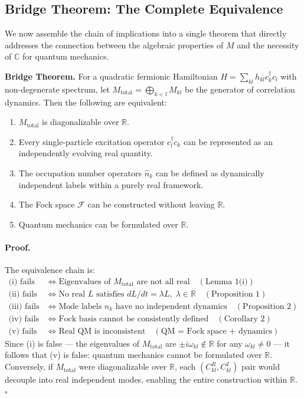 \documentclass[aps,pra,preprint,groupedaddress,amsmath,amssymb,floatfix]{revtex4-2}
\begin{document}
\subsection{Bridge Theorem: The Complete Equivalence}
\label{sec:th1_bridge}

We now assemble the chain of implications into a single theorem that directly addresses the connection between the algebraic properties of $M$ and the necessity of $\mathbb{C}$ for quantum mechanics.

\textbf{Bridge Theorem.} For a quadratic fermionic Hamiltonian $H = \sum_{kl} h_{kl} c^\dagger_k c_l$ with non-degenerate spectrum, let $M_{\text{total}} = \bigoplus_{k<l} M_{kl}$ be the generator of correlation dynamics. Then the following are equivalent:

\begin{enumerate}
\item[\textbf{(i)}] $M_{\text{total}}$ is diagonalizable over $\mathbb{R}$.
\item[\textbf{(ii)}] Every single-particle excitation operator $c^\dagger_l c_k$ can be represented as an independently evolving real quantity.
\item[\textbf{(iii)}] The occupation number operators $\hat{n}_k$ can be defined as dynamically independent labels within a purely real framework.
\item[\textbf{(iv)}] The Fock space $\mathcal{F}$ can be constructed without leaving $\mathbb{R}$.
\item[\textbf{(v)}] Quantum mechanics can be formulated over $\mathbb{R}$.
\end{enumerate}

\paragraph{Proof.} The equivalence chain is:
\begin{align*}
\text{(i) fails} &\Longleftrightarrow \text{Eigenvalues of } M_{\text{total}} \text{ are not all real} \quad (\text{Lemma~1(i)})\\
\text{(ii) fails} &\Longleftrightarrow \text{No real } L \text{ satisfies } dL/dt = \lambda L,\; \lambda\in\mathbb{R} \quad (\text{Proposition~1})\\
\text{(iii) fails} &\Longleftrightarrow \text{Mode labels } n_k \text{ have no independent dynamics} \quad (\text{Proposition~2})\\
\text{(iv) fails} &\Longleftrightarrow \text{Fock basis cannot be consistently defined} \quad (\text{Corollary~2})\\
\text{(v) fails} &\Longleftrightarrow \text{Real QM is inconsistent} \quad (\text{QM = Fock space + dynamics})
\end{align*}
Since (i) is false --- the eigenvalues of $M_{\text{total}}$ are $\pm i\omega_{kl} \notin \mathbb{R}$ for any $\omega_{kl} \neq 0$ --- it follows that (v) is false: quantum mechanics cannot be formulated over $\mathbb{R}$. Conversely, if $M_{\text{total}}$ were diagonalizable over $\mathbb{R}$, each $(C^R_{kl}, C^I_{kl})$ pair would decouple into real independent modes, enabling the entire construction within $\mathbb{R}$. $\square$
\end{document}
